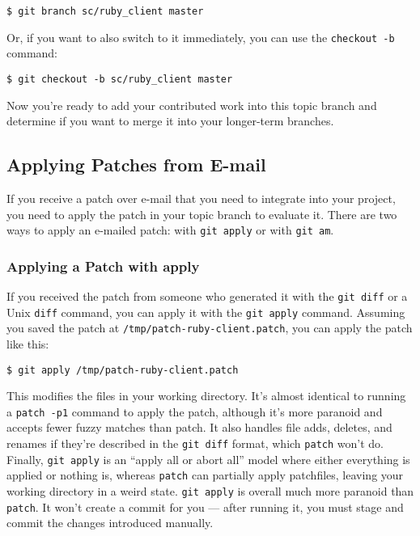 \documentclass[a4paper]{book}
\begin{document}
\begin{shaded}\begin{verbatim}
$ git branch sc/ruby_client master
\end{verbatim}\end{shaded}

Or, if you want to also switch to it immediately, you can use the \texttt{checkout -b} command:

\begin{shaded}\begin{verbatim}
$ git checkout -b sc/ruby_client master
\end{verbatim}\end{shaded}

Now you're ready to add your contributed work into this topic branch and determine if you want to merge it into your longer-term branches.

\subsection{Applying Patches from E-mail}\label{applying-patches-from-e-mail}

If you receive a patch over e-mail that you need to integrate into your project, you need to apply the patch in your topic branch to evaluate it. There are two ways to apply an e-mailed patch: with \texttt{git apply} or with \texttt{git am}.

\subsubsection{Applying a Patch with apply}

If you received the patch from someone who generated it with the \texttt{git diff} or a Unix \texttt{diff} command, you can apply it with the \texttt{git apply} command. Assuming you saved the patch at \texttt{/tmp/patch-ruby-client.patch}, you can apply the patch like this:

\begin{shaded}\begin{verbatim}
$ git apply /tmp/patch-ruby-client.patch
\end{verbatim}\end{shaded}

This modifies the files in your working directory. It's almost identical to running a \texttt{patch -p1} command to apply the patch, although it's more paranoid and accepts fewer fuzzy matches than patch. It also handles file adds, deletes, and renames if they're described in the \texttt{git diff} format, which \texttt{patch} won't do. Finally, \texttt{git apply} is an “apply all or abort all” model where either everything is applied or nothing is, whereas \texttt{patch} can partially apply patchfiles, leaving your working directory in a weird state. \texttt{git apply} is overall much more paranoid than \texttt{patch}. It won't create a commit for you --- after running it, you must stage and commit the changes introduced manually.
\end{document}
